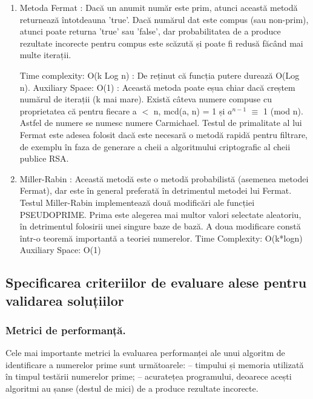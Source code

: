 \documentclass[runningheads]{llncs}
\begin{document}
\begin{enumerate}
    \item Metoda Fermat : Dacă un anumit număr este prim, atunci această metodă returnează întotdeauna 'true'. Dacă numărul
    dat este compus (sau non-prim), atunci poate returna 'true' sau 'false', dar probabilitatea de a produce rezultate
    incorecte pentru compus este scăzută și poate fi redusă făcând mai multe iterații. \newline

    Time complexity: O(k Log n) : De reținut că funcția putere durează O(Log n). \newline
    Auxiliary Space: O(1) : Această metoda poate eșua chiar dacă creștem numărul de iterații (k mai mare). Există câteva numere
    compuse cu proprietatea că pentru fiecare a $<$ n, mcd(a, n) = 1 și $a^{n-1}$ $\equiv$ 1 (mod n). Astfel de numere se
    numesc numere Carmichael. Testul de primalitate al lui Fermat este adesea folosit dacă este necesară o metodă rapidă pentru
    filtrare, de exemplu în faza de generare a cheii a algoritmului criptografic al cheii publice RSA. \newline
    
    \item Miller-Rabin : Această metodă este o metodă probabilistă (asemenea metodei Fermat), dar este în general preferată în
    detrimentul metodei lui Fermat. Testul Miller-Rabin implementează două modificări ale funcției PSEUDOPRIME. Prima este
    alegerea mai multor valori selectate aleatoriu, în detrimentul folosirii unei singure baze de bază. A doua modificare constă
    într-o teoremă importantă a teoriei numerelor. \newline \newline
    Time Complexity: O(k*logn) \newline
    Auxiliary Space: O(1)
    
\end{enumerate}

\subsection{Specificarea criteriilor de evaluare alese pentru validarea soluțiilor}

\subsubsection{Metrici de performanță.} Cele mai importante metrici la evaluarea performanței ale unui algoritm de identificare
a numerelor prime sunt următoarele: \newline
– timpului și memoria utilizată în timpul testării numerelor prime; \newline
– acuratețea programului, deoarece acești algoritmi au șanse (destul de mici) de a produce rezultate incorecte.
\end{document}
